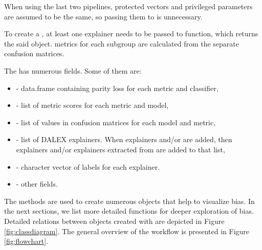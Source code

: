 When using the last two pipelines, protected vectors and privileged
parameters are assumed to be the same, so passing them to
 is unnecessary.

To create a , at least one explainer needs to
be passed to  function, which returns the said
object.  metrics for each subgroup are
calculated from the separate confusion matrices.

The  has numerous fields. Some of them are:

\begin{itemize}
\tightlist
\item
   - data.frame containing parity
  loss for each metric and classifier,
\item
   - list of metric scores for each metric and
  model,
\item
   - list of values in confusion
  matrices for each model and metric,
\item
   - list of DALEX explainers. When explainers and/or
   are added, then explainers and/or explainers
  extracted from  are added to that list,
\item
   - character vector of labels for each explainer.
\item
   - other fields.
\end{itemize}

The  methods are used to create numerous
objects that help to visualize bias. In the next sections, we list more
detailed functions for deeper exploration of bias. Detailed relations
between objects created with  are depicted in Figure
\ref{fig:classdiagram}. The general overview of the workflow is
presented in Figure \ref{fig:flowchart}.

